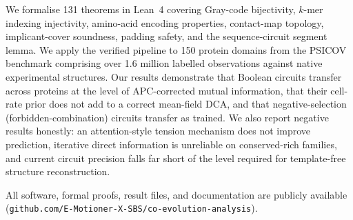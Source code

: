 We formalise 131 theorems in Lean~4 covering Gray-code bijectivity, $k$-mer
indexing injectivity, amino-acid encoding properties, contact-map topology,
implicant-cover soundness, padding safety, and the sequence-circuit segment lemma.  We apply the verified pipeline
to 150 protein domains from the PSICOV benchmark comprising over 1.6 million
labelled observations against native experimental structures.  Our results
demonstrate that Boolean circuits transfer across proteins at the level of
APC-corrected mutual information, that their cell-rate prior does not add to a
correct mean-field DCA, and that negative-selection (forbidden-combination)
circuits transfer as trained.  We also report negative results honestly: an attention-style
tension mechanism does not improve prediction, iterative direct information
is unreliable on conserved-rich families, and current circuit precision falls
far short of the level required for template-free structure reconstruction.

All software, formal proofs, result files, and documentation are publicly
available (\texttt{github.com/E-Motioner-X-SBS/co-evolution-analysis}).
